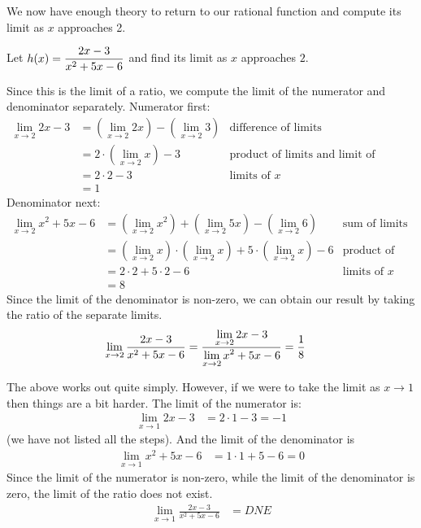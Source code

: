We now have enough theory to return to our rational function and compute its
limit as $x$ approaches 2.
\begin{eg}\label{eg_1_4_4}
 Let $\displaystyle h(x) = \frac{2x-3}{x^2+5x-6}$ and find its limit as $x$ approaches
$2$.

Since this is the limit  of a ratio, we compute the limit of the numerator and
denominator separately.
Numerator first:
\begin{align*}
  \lim_{x \to 2} 2x-3
  &= \left( \lim_{x \to 2} 2x \right) - \left( \lim_{x \to 2} 3 \right)
  & \text{difference of limits} \\
  &= 2 \cdot \left( \lim_{x \to 2} x \right) -3
  & \text{product of limits and limit of constant} \\
  &= 2 \cdot 2 -3
  & \text{limits of $x$} \\
  &= 1
\end{align*}
Denominator next:
\begin{align*}
  \lim_{x \to 2} x^2+5x-6
  &= \left( \lim_{x \to 2} x^2 \right) + \left( \lim_{x \to 2} 5x \right)
  - \left( \lim_{x \to 2} 6 \right)
  & \text{sum of limits} \\
  &= \left( \lim_{x \to 2} x \right)\cdot \left( \lim_{x \to 2} x \right)
  + 5 \cdot \left( \lim_{x \to 2} x \right) - 6
  & \text{product of limits and limit of constant} \\
  &= 2 \cdot 2 + 5 \cdot 2 - 6
  & \text{limits of $x$} \\
  &= 8
\end{align*}
Since the limit of the denominator is non-zero, we can obtain our result by
taking the ratio of the separate limits.
\begin{align*}
\lim_{x \to 2} \frac{2x-3}{x^2+5x-6}
  &= \frac{\displaystyle \lim_{x \to 2} 2x-3}{\displaystyle \lim_{x \to 2} x^2+5x-6} = \frac{1}{8}
\end{align*}

The above works out quite simply. However, if we were to take the limit as $x
\to 1$ then things are a bit harder. The limit of the numerator is:
\begin{align*}
  \lim_{x \to 1} 2x-3 &= 2 \cdot 1 - 3 = -1
\end{align*}
(we have not listed all the steps). And the limit of the denominator is
\begin{align*}
  \lim_{x \to 1} x^2 +5x-6 &= 1 \cdot 1 + 5 - 6 = 0
\end{align*}
Since the limit of the numerator is non-zero, while the limit of the
denominator is zero, the limit of the ratio does not exist.
\begin{align*}
\lim_{x \to 1} \frac{2x-3}{x^2+5x-6}
  &= DNE
\end{align*}
\end{eg}
